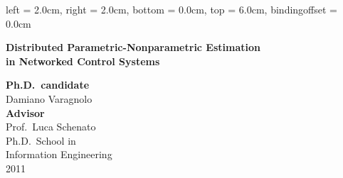 
\thispagestyle{empty}


\newgeometry
{
	left			= 2.0cm,
	right			= 2.0cm,
	bottom			= 0.0cm,
	top				= 6.0cm,
	bindingoffset	= 0.0cm
}

\begin{center}
	\textbf
	{
		\LARGE
		Distributed Parametric-Nonparametric Estimation \\
		in Networked Control Systems \\
	}
\end{center}
%
\vspace{8cm}
%
{
	\large
	\begin{flushright}
		{\bf Ph.D.\ candidate} \\
		Damiano Varagnolo \\
		\vspace{1cm}
		{\bf Advisor} \\
		Prof.\ Luca Schenato \\
		\vspace{7.5cm}
		Ph.D.\ School in \\
		Information Engineering \\
		2011
	\end{flushright}
}

\newpage
\thispagestyle{empty}
\restoregeometry

